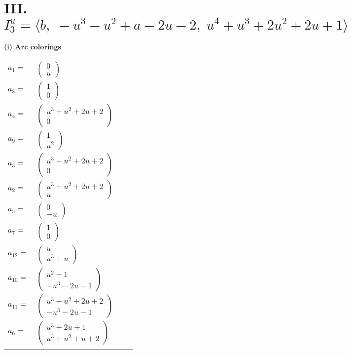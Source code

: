 \documentclass[1p]{elsarticle_modified}
\theoremstyle{definition}
\begin{document}
\centering \section*{III. $I^u_{3}= \langle b,\;- u^3- u^2+a-2 u-2,\;u^4+u^3+2 u^2+2 u+1 \rangle$}
\flushleft \textbf{(i) Arc colorings}\\
\begin{tabular}{m{7pt} m{180pt} m{7pt} m{180pt} }
\flushright $a_{1}=$&$\begin{pmatrix}0\\u\end{pmatrix}$ \\
\flushright $a_{8}=$&$\begin{pmatrix}1\\0\end{pmatrix}$ \\
\flushright $a_{4}=$&$\begin{pmatrix}u^3+u^2+2 u+2\\0\end{pmatrix}$ \\
\flushright $a_{9}=$&$\begin{pmatrix}1\\u^2\end{pmatrix}$ \\
\flushright $a_{3}=$&$\begin{pmatrix}u^3+u^2+2 u+2\\0\end{pmatrix}$ \\
\flushright $a_{2}=$&$\begin{pmatrix}u^3+u^2+2 u+2\\u\end{pmatrix}$ \\
\flushright $a_{5}=$&$\begin{pmatrix}0\\- u\end{pmatrix}$ \\
\flushright $a_{7}=$&$\begin{pmatrix}1\\0\end{pmatrix}$ \\
\flushright $a_{12}=$&$\begin{pmatrix}u\\u^3+u\end{pmatrix}$ \\
\flushright $a_{10}=$&$\begin{pmatrix}u^2+1\\- u^3-2 u-1\end{pmatrix}$ \\
\flushright $a_{11}=$&$\begin{pmatrix}u^3+u^2+2 u+2\\- u^3-2 u-1\end{pmatrix}$ \\
\flushright $a_{6}=$&$\begin{pmatrix}u^3+2 u+1\\u^3+u^2+u+2\end{pmatrix}$\\&\end{tabular}
\end{document}
